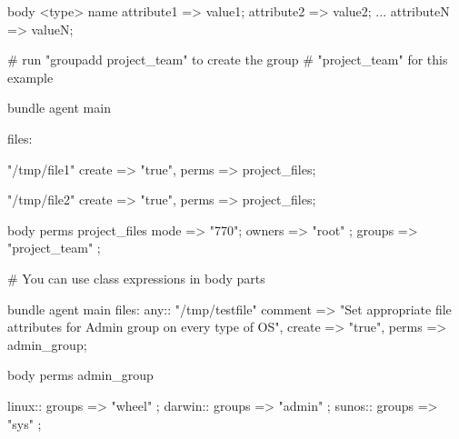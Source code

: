 \begin{codelisting}
\begin{code}
body <type> name
{
  attribute1 => value1;
  attribute2 => value2;
  ...
  attributeN => valueN;
}
\end{code}
\end{codelisting}
\begin{codelisting}
\begin{code}
# run "groupadd project_team" to create the group
# "project_team" for this example

bundle agent main
{
  files:

      "/tmp/file1"
        create => "true",
        perms   => project_files;

      "/tmp/file2"
        create => "true",
        perms   => project_files;
}

body perms project_files
{
        mode   => "770";
        owners => { "root" };
        groups => { "project_team" };
}
\end{code}
\end{codelisting}
\begin{codelisting}
\begin{code}
# You can use class expressions in body parts

bundle agent main
{
  files:
    any::
      "/tmp/testfile"
        comment  => "Set appropriate file attributes for Admin group
                     on every type of OS",
        create  => "true",
        perms   => admin_group;
}

body perms admin_group
{
  linux::  groups => { "wheel" };
  darwin:: groups => { "admin" };
  sunos::  groups => { "sys" };

}
\end{code}
\end{codelisting}
\begin{codelisting}
\end{codelisting}
